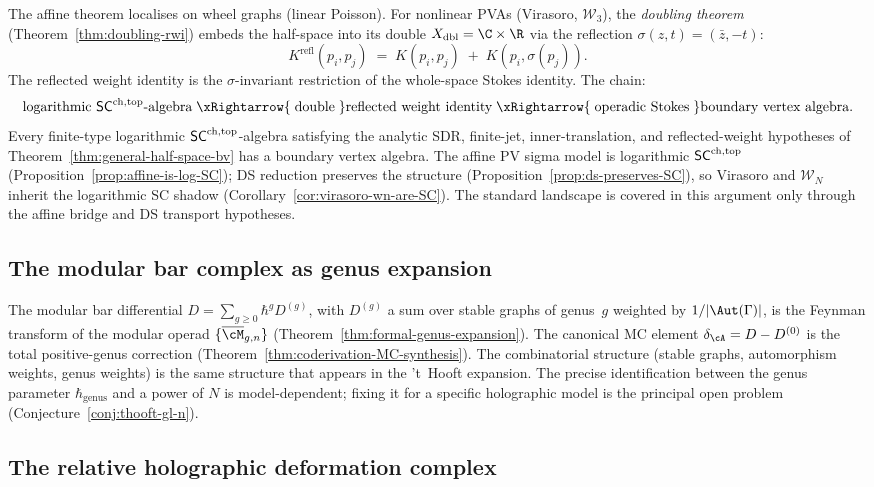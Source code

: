 The affine theorem localises on wheel graphs (linear Poisson).
For nonlinear PVAs (Virasoro, $\mathcal{W}_3$), the
\emph{doubling theorem} (Theorem~\ref{thm:doubling-rwi})
embeds the half-space into its double
$X_{\mathrm{dbl}} = \C \times \R$ via the reflection
$\sigma(z,t) = (\bar z, -t)$:
\[
K^{\mathrm{refl}}(p_i, p_j)
\;=\;
K(p_i, p_j) \;+\; K(p_i, \sigma(p_j)).
\]
The reflected weight identity is the $\sigma$-invariant
restriction of the whole-space Stokes identity. The chain:
\[
\text{logarithmic $\SCchtop$-algebra}
\;\xRightarrow{\;\text{double}\;}
\text{reflected weight identity}
\;\xRightarrow{\;\text{operadic Stokes}\;}
\text{boundary vertex algebra}.
\]
Every finite-type logarithmic $\mathsf{SC}^{\mathrm{ch,top}}$-algebra satisfying the
analytic SDR, finite-jet, inner-translation, and reflected-weight
hypotheses of Theorem~\ref{thm:general-half-space-bv} has a boundary
vertex algebra. The affine PV sigma model is logarithmic $\mathsf{SC}^{\mathrm{ch,top}}$
(Proposition~\ref{prop:affine-is-log-SC}); DS reduction preserves
the structure (Proposition~\ref{prop:ds-preserves-SC}), so
Virasoro and $\mathcal{W}_N$ inherit the logarithmic SC shadow
(Corollary~\ref{cor:virasoro-wn-are-SC}). The standard landscape
is covered in this argument only through the affine bridge and DS
transport hypotheses.

\subsection*{The modular bar complex as genus expansion}

The modular bar differential
$D = \sum_{g \ge 0} \hbar^g D^{(g)}$, with $D^{(g)}$
a sum over stable graphs of genus~$g$ weighted by
$1/|\Aut(\Gamma)|$, is the Feynman transform of the modular
operad $\{\overline{\cM}_{g,n}\}$
(Theorem~\ref{thm:formal-genus-expansion}). The canonical MC
element $\delta_\cA = D - D^{(0)}$ is the total positive-genus
correction (Theorem~\ref{thm:coderivation-MC-synthesis}). The
combinatorial structure (stable graphs, automorphism weights,
genus weights) is the same structure that appears in the 't~Hooft
expansion. The precise identification between the genus parameter
$\hbar_{\mathrm{genus}}$ and a power of $N$ is model-dependent; fixing
it for a specific holographic model is the principal open problem
(Conjecture~\ref{conj:thooft-gl-n}).

\subsection*{The relative holographic deformation complex}

